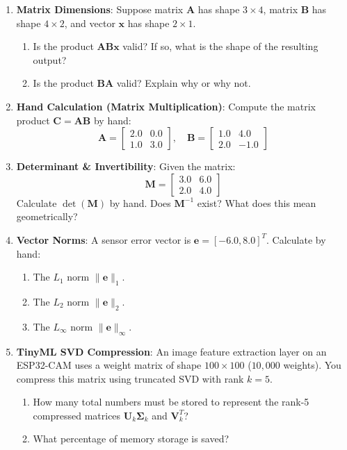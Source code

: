 \begin{enumerate}
    \item \textbf{Matrix Dimensions}: Suppose matrix $\mathbf{A}$ has shape $3 \times 4$, matrix $\mathbf{B}$ has shape $4 \times 2$, and vector $\mathbf{x}$ has shape $2 \times 1$.
    \begin{enumerate}
        \item Is the product $\mathbf{A}\mathbf{B}\mathbf{x}$ valid? If so, what is the shape of the resulting output?
        \item Is the product $\mathbf{B}\mathbf{A}$ valid? Explain why or why not.
    \end{enumerate}

    \item \textbf{Hand Calculation (Matrix Multiplication)}: Compute the matrix product $\mathbf{C} = \mathbf{A}\mathbf{B}$ by hand:
    \begin{equation*}
    \mathbf{A} = \begin{bmatrix} 2.0 & 0.0 \\ 1.0 & 3.0 \end{bmatrix}, \quad
    \mathbf{B} = \begin{bmatrix} 1.0 & 4.0 \\ 2.0 & -1.0 \end{bmatrix}
    \end{equation*}

    \item \textbf{Determinant \& Invertibility}: Given the matrix:
    \begin{equation*}
    \mathbf{M} = \begin{bmatrix} 3.0 & 6.0 \\ 2.0 & 4.0 \end{bmatrix}
    \end{equation*}
    Calculate $\det(\mathbf{M})$ by hand. Does $\mathbf{M}^{-1}$ exist? What does this mean geometrically?

    \item \textbf{Vector Norms}: A sensor error vector is $\mathbf{e} = [-6.0, 8.0]^T$. Calculate by hand:
    \begin{enumerate}
        \item The $L_1$ norm $\|\mathbf{e}\|_1$.
        \item The $L_2$ norm $\|\mathbf{e}\|_2$.
        \item The $L_\infty$ norm $\|\mathbf{e}\|_\infty$.
    \end{enumerate}

    \item \textbf{TinyML SVD Compression}: An image feature extraction layer on an ESP32-CAM uses a weight matrix of shape $100 \times 100$ ($10{,}000$ weights). You compress this matrix using truncated SVD with rank $k = 5$.
    \begin{enumerate}
        \item How many total numbers must be stored to represent the rank-5 compressed matrices $\mathbf{U}_k \mathbf{\Sigma}_k$ and $\mathbf{V}_k^T$?
        \item What percentage of memory storage is saved?
    \end{enumerate}
\end{enumerate}

